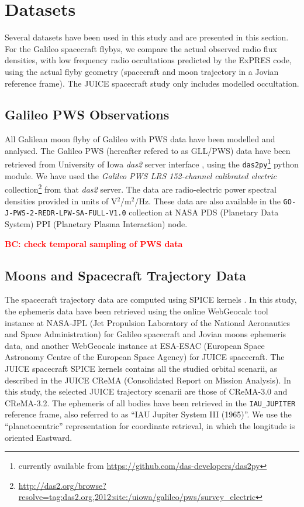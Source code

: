 \documentclass[referee]{aa}
\newcommand{\tbd}[1]{\textcolor{red}{\textbf{#1}}}
\begin{document}
\section{Datasets} %
Several datasets have been used in this study and are presented in this section. For the Galileo spacecraft flybys, we compare the actual observed radio flux densities, with low frequency radio occultations predicted by the ExPRES code, using the actual flyby geometry (spacecraft and moon trajectory in a Jovian reference frame). The JUICE spacecraft study only includes modelled occultation.

\subsection{Galileo PWS Observations}
\label{gll-pws-data}
All Galilean moon flyby of Galileo with PWS data have been modelled and analysed. The Galileo PWS (hereafter refered to as GLL/PWS) data have been retrieved from University of Iowa \emph{das2} server interface \citep{piker_2019}, using the \texttt{das2py}\footnote{currently available from \url{https://github.com/das-developers/das2py}} python module. We have used the \emph{Galileo PWS LRS 152-channel calibrated electric} collection\footnote{\url{ http://das2.org/browse?resolve=tag:das2.org,2012:site:/uiowa/galileo/pws/survey_electric}} from that \emph{das2} server. The data are radio-electric power spectral densities provided in units of V$^2$/m$^2$/Hz. These data are also available in the \verb|GO-J-PWS-2-REDR-LPW-SA-FULL-V1.0| collection \citep{PWS_LPW_PDS} at NASA PDS (Planetary Data System) PPI (Planetary Plasma Interaction) node. 

\tbd{BC: check temporal sampling of PWS data}

\subsection{Moons and Spacecraft Trajectory Data}
The spacecraft trajectory data are computed using SPICE kernels \citep{1996P&SS...44...65A}. In this study, the ephemeris data have been retrieved using the online WebGeocalc tool instance at NASA-JPL (Jet Propulsion Laboratory of the National Aeronautics and Space Administration) \citep{Acton:2018dd} for Galileo spacecraft and Jovian moons ephemeris data, and another WebGeocalc instance at ESA-ESAC (European Space Astronomy Centre of the European Space Agency) for JUICE spacecraft. The JUICE spacecraft SPICE kernels \citep{juice-kernet-set} contains all the studied orbital scenarii, as described in the JUICE CReMA (Consolidated Report on Mission Analysis). In this study, the selected JUICE trajectory scenarii are those of CReMA-3.0 and CReMA-3.2. The ephemeris of all bodies have been retrieved in the \verb|IAU_JUPITER| reference frame, also referred to as ``IAU Jupiter System III (1965)''. We use the ``planetocentric'' representation for coordinate retrieval, in which the longitude is oriented Eastward. 
\end{document}

